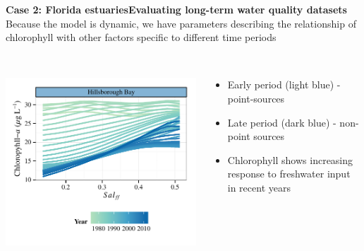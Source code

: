 \documentclass[serif]{beamer}\usepackage[]{graphicx}\usepackage[]{color}
\makeatletter
\def\maxwidth{ %
  \ifdim\Gin@nat@width>\linewidth
    \linewidth
  \else
    \Gin@nat@width
  \fi
}
\makeatother
\begin{document}
\begin{frame}{\textbf{Case 2: Florida estuaries}}{\textbf{Evaluating long-term water quality datasets}}
Because the model is dynamic, we have parameters describing the relationship of chlorophyll with other factors specific to different time periods \\~\\
\begin{columns}[T]
\begin{column}{0.45\textwidth}


{\centering \includegraphics[width=\maxwidth]{fig/hill-1} 

}



\end{column}
\begin{column}{0.45\textwidth}
\begin{itemize}
\item Early period (light blue) - point-sources
\item Late period (dark blue) - non-point sources
\item Chlorophyll shows increasing response to freshwater input in recent years
\end{itemize}
\end{column}
\end{columns}
\end{frame}

\end{document}
